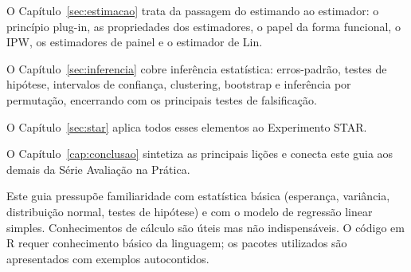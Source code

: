 O Capítulo~\ref{sec:estimacao} trata da passagem do estimando ao estimador:
o princípio plug-in, as propriedades dos estimadores, o papel da forma
funcional, o IPW, os estimadores de painel e o estimador de Lin.

O Capítulo~\ref{sec:inferencia} cobre inferência estatística: erros-padrão,
testes de hipótese, intervalos de confiança, clustering, bootstrap e
inferência por permutação, encerrando com os principais testes de
falsificação.

O Capítulo~\ref{sec:star} aplica todos esses elementos ao Experimento STAR.

O Capítulo~\ref{cap:conclusao} sintetiza as principais lições e conecta
este guia aos demais da Série Avaliação na Prática.

\begin{notabox}
Este guia pressupõe familiaridade com estatística básica (esperança,
variância, distribuição normal, testes de hipótese) e com o modelo de
regressão linear simples. Conhecimentos de cálculo são úteis mas não
indispensáveis. O código em R requer conhecimento básico da linguagem;
os pacotes utilizados são apresentados com exemplos autocontidos.
\end{notabox}